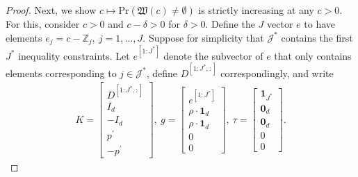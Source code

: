 \documentclass[letterpaper,11pt]{article}
\theoremstyle{myplain}
\theoremstyle{mydefinition}
\theoremstyle{myremark}
\newcommand{\HH}{\mathbb{Z}}
\newcommand{\cJ}{\mathcal{J}}
\numberwithin{equation}{section}
\numberwithin{figure}{section}
\begin{document}
\begin{appendices}
\begin{proof}
Next, we show $c\mapsto\mathrm{Pr}\left(\mathfrak{W}(c)\neq \emptyset \right)$ is strictly increasing at any $c>0$.
For this, consider $c>0$ and $c-\delta>0$ for $\delta>0$. 
Define the $J$ vector $e$ to have elements $e_j = c - \HH_j,~j=1,\dots,J$. Suppose for simplicity that $\cJ^*$ contains the first $J^*$ inequality constraints. Let $e^{[1:J^*]}$ denote the subvector of $e$ that only contains elements corresponding to $j \in \cJ^*$, define $D^{[1:J^*,:]}$ correspondingly, and write 
\begin{align}
K=\left[ 
\begin{array}{c}
D^{[1:J^*,:]} \\ 
I_{d} \\ 
-I_{d} \\ 
p^{\prime } \\ 
-p^{\prime }
\end{array}
\right] ,~g=\left[ 
\begin{array}{c}
e^{[1:J^*]} \\ 
\rho \cdot \mathbf{1}_{d} \\ 
\rho \cdot \mathbf{1}_{d} \\ 
0 \\ 
0
\end{array}
\right] ,~\tau =\left[ 
\begin{array}{c}
\mathbf{1}_{J^*} \\ 
\mathbf{0}_{d} \\ 
\mathbf{0}_{d} \\ 
0 \\ 
0
\end{array}
\right] .\label{eq:Kgtau}
\end{align}


\end{proof}
\end{appendices}
\end{document}
